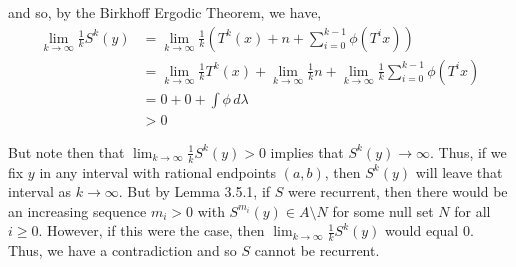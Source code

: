 \documentclass[12pt]{article}
\begin{document}
\begin{enumerate}[label=\alph*)]
and so, by the Birkhoff Ergodic Theorem, we have,
\begin{align*}
\lim_{k \to \infty} \frac{1}{k} S^k(y) &= \lim_{k \to \infty} \frac{1}{k} (T^k(x) + n + \sum_{i=0}^{k-1} \phi(T^ix))\\
&= \lim_{k \to \infty} \frac{1}{k} T^k(x) +   \lim_{k \to \infty} \frac{1}{k} n +  \lim_{k \to \infty} \frac{1}{k} \sum_{i=0}^{k-1} \phi(T^ix)\\
&= 0 + 0 + \int \phi \, d \lambda\\
&> 0
\end{align*}

But note then that $\lim_{k \to \infty} \frac{1}{k} S^k(y) > 0$ implies that $S^k(y) \to \infty$. Thus, if we fix $y$ in any interval with rational endpoints $(a, b)$, then $S^k(y)$ will leave that interval as $k \to \infty$. But by Lemma 3.5.1, if $S$ were recurrent, then there would be an increasing sequence $m_i > 0$ with $S^{m_i}(y) \in A \setminus N$ for some null set $N$ for all $i \geq 0$. However, if this were the case, then $\lim_{k \to \infty} \frac{1}{k} S^k(y)$ would equal $0$. Thus, we have a contradiction and so $S$ cannot be recurrent.
\end{enumerate}
\end{document}

